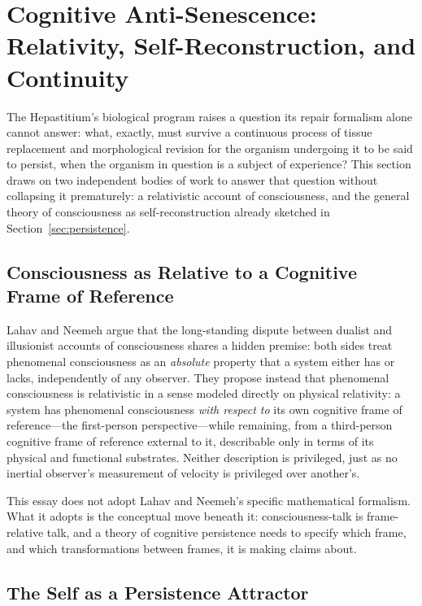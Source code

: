 \documentclass[12pt]{article}
\begin{document}
\section{Cognitive Anti-Senescence: Relativity, Self-Reconstruction, and Continuity}
\label{sec:cognitive}

The Hepastitium's biological program raises a question its repair formalism alone cannot answer: what, exactly, must survive a continuous process of tissue replacement and morphological revision for the organism undergoing it to be said to persist, when the organism in question is a subject of experience? This section draws on two independent bodies of work to answer that question without collapsing it prematurely: a relativistic account of consciousness, and the general theory of consciousness as self-reconstruction already sketched in Section~\ref{sec:persistence}.

\subsection{Consciousness as Relative to a Cognitive Frame of Reference}

Lahav and Neemeh \cite{lahavneemeh2022} argue that the long-standing dispute between dualist and illusionist accounts of consciousness shares a hidden premise: both sides treat phenomenal consciousness as an \emph{absolute} property that a system either has or lacks, independently of any observer. They propose instead that phenomenal consciousness is relativistic in a sense modeled directly on physical relativity: a system has phenomenal consciousness \emph{with respect to} its own cognitive frame of reference---the first-person perspective---while remaining, from a third-person cognitive frame of reference external to it, describable only in terms of its physical and functional substrates. Neither description is privileged, just as no inertial observer's measurement of velocity is privileged over another's.

This essay does not adopt Lahav and Neemeh's specific mathematical formalism. What it adopts is the conceptual move beneath it: consciousness-talk is frame-relative talk, and a theory of cognitive persistence needs to specify which frame, and which transformations between frames, it is making claims about.

\subsection{The Self as a Persistence Attractor}
\end{document}
